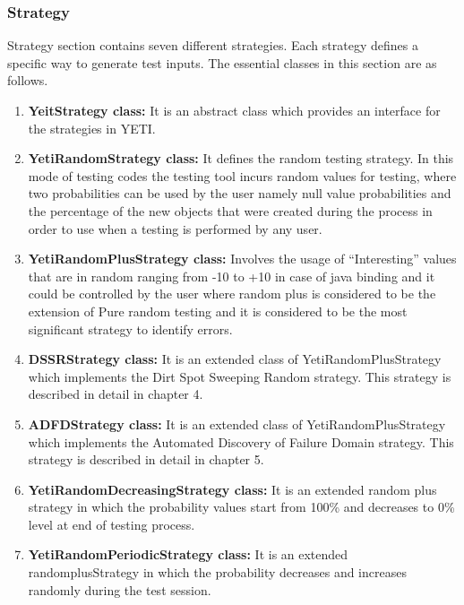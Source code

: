 \subsubsection{Strategy}
Strategy section contains seven different strategies. Each strategy defines a specific way to generate test inputs. The essential classes in this section are as follows.
\begin{enumerate}
\item {\textbf{YeitStrategy class:}} It is an abstract class which provides an interface for the strategies in YETI.
\item {\textbf{YetiRandomStrategy class:}} It defines the random testing strategy. In this mode of testing codes the testing tool incurs random values for testing, where two probabilities can be used by the user namely null value probabilities and the percentage of the new objects that were created during the process in order to use when a testing is performed by any user.
\item {\textbf{YetiRandomPlusStrategy class:}} Involves the usage of “Interesting” values that are in random ranging from -10 to +10 in case of java binding and it could be controlled by the user where random plus is considered to be the extension of Pure random testing and it is considered to be the most significant strategy to identify errors.
\item {\textbf{DSSRStrategy class:}} It is an extended class of YetiRandomPlusStrategy which implements the Dirt Spot Sweeping Random strategy. This strategy is described in detail in chapter 4.
\item {\textbf{ADFDStrategy class:}} It is an extended class of YetiRandomPlusStrategy which implements the Automated Discovery of Failure Domain strategy.  This strategy is described in detail in chapter 5.
\item {\textbf{YetiRandomDecreasingStrategy class:}} It is an extended random plus strategy in which the probability values start from 100\% and decreases to 0\% level at end of testing process.
\item {\textbf{YetiRandomPeriodicStrategy class:}} It is an extended randomplusStrategy in which the probability decreases and increases randomly during the test session.
\end{enumerate}

